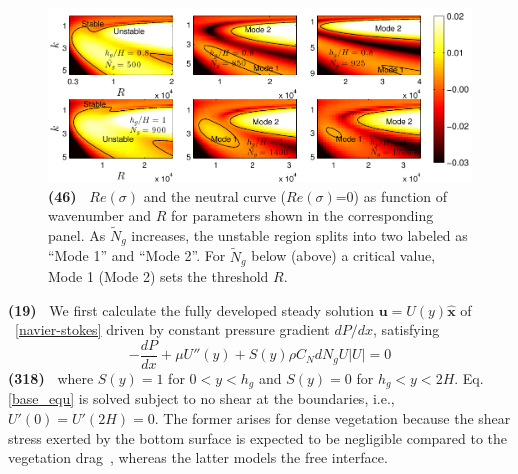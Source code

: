 \documentclass[aps,prl,reprint,twocolumn,superscriptaddress,sort&compress,10pt]{revtex4-1}  %
\newcommand{\bu}{\mathbf{u}}
\newcommand{\hg}{h_g}
\newcommand{\Rey}{{R}}
\newcommand{\Ndg}{\tilde{N}_g}
\newcommand{\words}[1]{\textbf{(#1)~}}
\begin{document}
\begin{figure}
 \includegraphics[width=\textwidth]{SetAll_imgsc}

\caption{
\words{46} $Re(\sigma)$ and the neutral curve ($Re(\sigma)$=0) as function of wavenumber and $\Rey$ for parameters shown in the corresponding panel.  
As $\Ndg$ increases, the unstable region splits into two labeled as ``Mode 1'' and ``Mode 2''. 
For $\Ndg$ below (above) a critical value, Mode 1 (Mode 2) sets the threshold $\Rey$.
}
\label{K_Re_sigma_set3}
\end{figure}
\words{19} We first calculate the fully developed steady solution $\bu = U(y)\boldsymbol{\hat{x}}$ of ~\eqref{navier-stokes} driven by constant pressure gradient $dP/dx$, satisfying
\begin{equation}
 -\frac{dP}{dx}+\mu U''(y) +S(y) \rho C_N d N_gU |U|=0
\label{base_equ}
\end{equation}
\words{318} where $S(y)=1$ for $0<y<\hg$ and $S(y)=0$ for $\hg< y< 2H$. 
Eq. \eqref{base_equ} is solved subject to no shear at the boundaries, i.e., $U'(0) = U'(2H) = 0$.
The former arises for dense vegetation because the shear stress exerted by the bottom surface is expected to be negligible compared to the vegetation drag~\cite{Nepf00}, whereas the latter models the free interface. 
\end{document}

